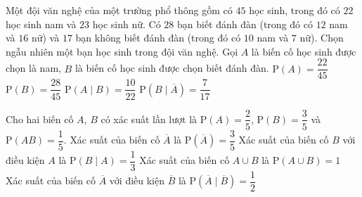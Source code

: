 \begin{ex}%
	Một đội văn nghệ của một trường phổ thông gồm có $45$ học sinh, trong đó có $22$ học sinh nam và $23$ học sinh nữ. Có $28$ bạn biết đánh đàn (trong đó có $12$ nam và $16$ nữ) và $17$ bạn không biết đánh đàn  (trong đó có $10$ nam và $7$ nữ). Chọn ngẫu nhiên một bạn học sinh trong đội văn nghệ. Gọi $A$ là biến cố học sinh được chọn là nam, $B$ là biến cố học sinh được chọn biết đánh đàn.
	 \choiceTF
		{\True $\mathrm{P}(A)=\dfrac{22}{45}$} 
		{\True  $\mathrm{P}(B)=\dfrac{28}{45}$}
		{$\mathrm{P}(A \mid  B)=\dfrac{10}{22}$}
		{$\mathrm{P}\left(B  \mid \overline{A}\right)=\dfrac{7}{17}$}
\end{ex}

\begin{ex}%
	Cho hai biến cố $A$, $B$ có xác suất lần lượt  là $\mathrm{P}( A)=\dfrac{2}{5}$, $\mathrm{P}( B)=\dfrac{3}{5}$ và\break $\mathrm{P}(AB)=\dfrac{1}{5}$.
	\choiceTF 
		{\True Xác suất của biến cố $\overline{A}$ là  $\mathrm{P}(\overline{A})=\dfrac{3}{5}$}
		{Xác suất của biến cố $B$ với điều kiện $A$ là  $\mathrm{P}(B\mid A)=\dfrac{1}{3}$}
		{Xác suất của biến cố  $A\cup B$ là $\mathrm{P}(A\cup B)=1$}
		{\True  Xác suất của biến cố $\overline{A}$ với điều kiện $\overline{B}$ là $\mathrm{P}(\overline{A}\mid\overline{B})=\dfrac{1}{2}$}
\end{ex}



